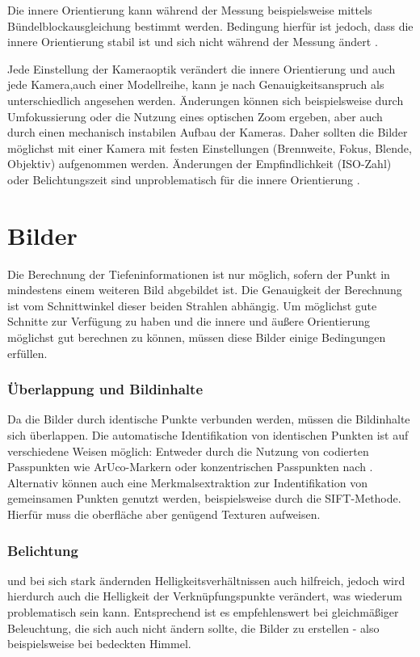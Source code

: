 \documentclass[./00_PhotoBox.tex]{subfiles}
\begin{document}
Die innere Orientierung kann während der Messung beispielsweise mittels Bündel\-block\-ausgleichung bestimmt werden. Bedingung hierfür ist jedoch, dass die innere Orientierung stabil ist und sich nicht während der Messung ändert \citep[S. 181f]{luhmann}.

Jede Einstellung der Kameraoptik verändert die innere Orientierung und auch jede Kamera,auch einer Modellreihe, kann je nach Genauigkeitsanspruch als unterschiedlich angesehen werden. Änderungen können sich beispielsweise durch Umfokussierung oder die Nutzung eines optischen Zoom ergeben, aber auch durch einen mechanisch instabilen Aufbau der Kameras. Daher sollten die Bilder möglichst mit einer Kamera mit festen Einstellungen (Brennweite, Fokus, Blende, Objektiv) aufgenommen werden. Änderungen der Empfindlichkeit (ISO-Zahl) oder Belichtungszeit sind unproblematisch für die innere Orientierung \citep[S. 176]{luhmann}.


\section{Bilder}
\label{s:bilder}

Die Berechnung der Tiefeninformationen ist nur möglich, sofern der Punkt in mindestens einem weiteren Bild abgebildet ist. Die Genauigkeit der Berechnung ist vom Schnittwinkel dieser beiden Strahlen abhängig. Um möglichst gute Schnitte zur Ver\-fügung zu haben und die innere und äußere Orientierung möglichst gut berechnen zu können, müssen diese Bilder einige Bedingungen erfüllen.

\subsubsection{Überlappung und Bildinhalte}
Da die Bilder durch identische Punkte verbunden werden, müssen die Bildinhalte sich überlappen. Die automatische Identifikation von identischen Punkten ist auf verschiedene Weisen möglich: Entweder durch die Nutzung von codierten Passpunkten wie ArUco-Markern oder konzentrischen Passpunkten nach \cite{schneider}. Alternativ können auch eine Merkmalsextraktion zur Indentifikation von gemeinsamen Punkten genutzt werden, beispielsweise durch die SIFT-Methode. Hierfür muss die oberfläche aber genügend Texturen aufweisen. \citep[S. 478]{luhmann}

\subsubsection{Belichtung}
und bei sich stark ändernden Helligkeitsverhältnissen auch hilfreich, jedoch wird hierdurch auch die Helligkeit der Verknüpfungspunkte verändert, was wiederum problematisch sein kann. Entsprechend ist es empfehlenswert bei gleichmäßiger Beleuchtung, die sich auch nicht ändern sollte, die Bilder zu erstellen - also beispielsweise bei bedeckten Himmel.
\end{document}

